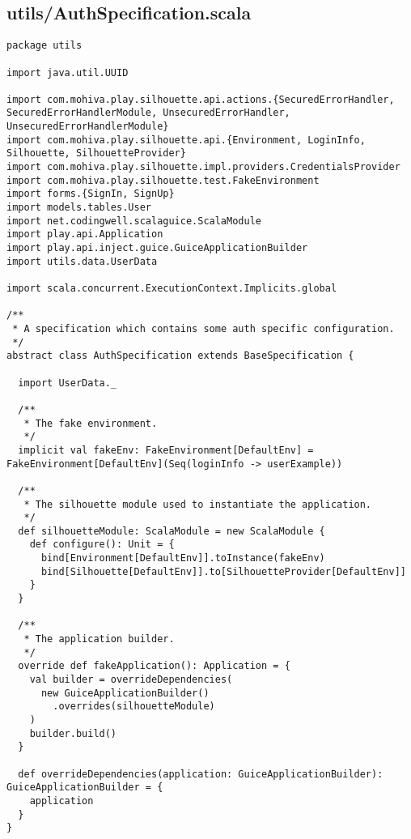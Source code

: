 \subsection{utils/AuthSpecification.scala}
\begin{lstlisting}
package utils

import java.util.UUID

import com.mohiva.play.silhouette.api.actions.{SecuredErrorHandler, SecuredErrorHandlerModule, UnsecuredErrorHandler, UnsecuredErrorHandlerModule}
import com.mohiva.play.silhouette.api.{Environment, LoginInfo, Silhouette, SilhouetteProvider}
import com.mohiva.play.silhouette.impl.providers.CredentialsProvider
import com.mohiva.play.silhouette.test.FakeEnvironment
import forms.{SignIn, SignUp}
import models.tables.User
import net.codingwell.scalaguice.ScalaModule
import play.api.Application
import play.api.inject.guice.GuiceApplicationBuilder
import utils.data.UserData

import scala.concurrent.ExecutionContext.Implicits.global

/**
 * A specification which contains some auth specific configuration.
 */
abstract class AuthSpecification extends BaseSpecification {

  import UserData._

  /**
   * The fake environment.
   */
  implicit val fakeEnv: FakeEnvironment[DefaultEnv] = FakeEnvironment[DefaultEnv](Seq(loginInfo -> userExample))

  /**
   * The silhouette module used to instantiate the application.
   */
  def silhouetteModule: ScalaModule = new ScalaModule {
    def configure(): Unit = {
      bind[Environment[DefaultEnv]].toInstance(fakeEnv)
      bind[Silhouette[DefaultEnv]].to[SilhouetteProvider[DefaultEnv]]
    }
  }

  /**
   * The application builder.
   */
  override def fakeApplication(): Application = {
    val builder = overrideDependencies(
      new GuiceApplicationBuilder()
        .overrides(silhouetteModule)
    )
    builder.build()
  }

  def overrideDependencies(application: GuiceApplicationBuilder): GuiceApplicationBuilder = {
    application
  }
}
\end{lstlisting}
